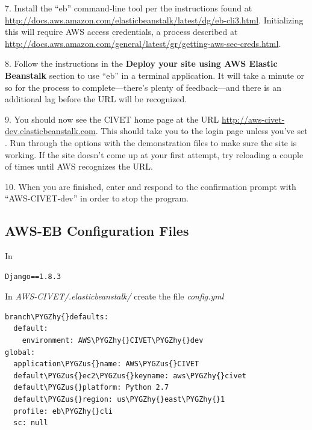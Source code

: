 \documentclass[letterpaper,10pt,english]{sphinxmanual}
\def\PYGZus{\char`\_}
\def\PYGZhy{\char`\-}
\begin{document}
7. Install the “eb” command-line tool per the instructions found at
\href{http://docs.aws.amazon.com/elasticbeanstalk/latest/dg/eb-cli3.html}{http://docs.aws.amazon.com/elasticbeanstalk/latest/dg/eb-cli3.html}. Initializing this will require AWS access credentials, a
process described at \href{http://docs.aws.amazon.com/general/latest/gr/getting-aws-sec-creds.html}{http://docs.aws.amazon.com/general/latest/gr/getting-aws-sec-creds.html}.

8. Follow the instructions in the \textbf{Deploy your site using AWS Elastic Beanstalk} section to use “eb” in a terminal
application. It will take a minute or so for the  process to complete—there's plenty of feedback—and there is an
additional lag before the URL will be recognized.

9. You should now see the CIVET home page at the URL \href{http://aws-civet-dev.elasticbeanstalk.com}{http://aws-civet-dev.elasticbeanstalk.com}. This should take you to the
login page unless you've set . Run through the options with the demonstration files to make sure
the site is working. If the site doesn't come up at your first attempt, try reloading a couple of times until AWS
recognizes the URL.

10. When you are finished, enter  and respond to the confirmation prompt with “AWS-CIVET-dev” in order to
stop the program.


\subsection{AWS-EB Configuration Files}
\label{appendix5:aws-eb-configuration-files}
In

\begin{Verbatim}[commandchars=\\\{\}]
Django==1.8.3
\end{Verbatim}

In \emph{AWS-CIVET/.elasticbeanstalk/} create the file \emph{config.yml}

\begin{Verbatim}[commandchars=\\\{\}]
branch\PYGZhy{}defaults:
  default:
    environment: AWS\PYGZhy{}CIVET\PYGZhy{}dev
global:
  application\PYGZus{}name: AWS\PYGZus{}CIVET
  default\PYGZus{}ec2\PYGZus{}keyname: aws\PYGZhy{}civet
  default\PYGZus{}platform: Python 2.7
  default\PYGZus{}region: us\PYGZhy{}east\PYGZhy{}1
  profile: eb\PYGZhy{}cli
  sc: null
\end{Verbatim}
\end{document}
